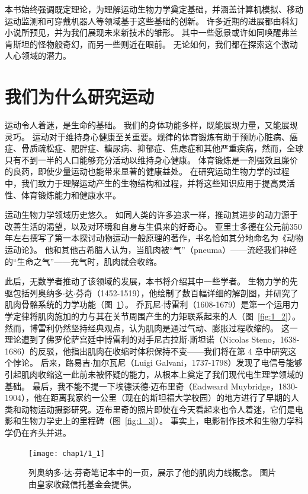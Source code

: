 本书始终强调既定理论，为理解运动生物力学奠定基础，并涵盖计算机模拟、移动运动监测和可穿戴机器人等领域基于这些基础的创新。
许多近期的进展都由科幻小说所预见，并为我们展现未来新技术的雏形。
其中一些愿景或许如同唤醒弗兰肯斯坦的怪物般奇幻，而另一些则近在眼前。
无论如何，我们都在探索这个激动人心领域的潜力。






\section{我们为什么研究运动}

运动令人着迷，是生命的基础。
我们的身体功能多样，既能展现力量，又能展现灵巧。
运动对于维持身心健康至关重要。规律的体育锻炼有助于预防心脏病、癌症、骨质疏松症、肥胖症、糖尿病、抑郁症、焦虑症和其他严重疾病，然而，全球只有不到一半的人口能够充分活动以维持身心健康。
体育锻炼是一剂强效且廉价的良药，即使少量运动也能带来显著的健康益处。
在研究运动生物力学的过程中，我们致力于理解运动产生的生物结构和过程，并将这些知识应用于提高灵活性、体育锻炼能力和健康水平。


运动生物力学领域历史悠久。
如同人类的许多追求一样，推动其进步的动力源于改善生活的渴望，以及对环境和自身与生俱来的好奇心。
亚里士多德在公元前350年左右撰写了第一本探讨动物运动一般原理的著作，书名恰如其分地命名为《动物运动论》。
他和其他古希腊人认为，当肌肉被“气”（pneuma）——流经我们神经的“生命之气”——充气时，肌肉就会收缩。


此后，无数学者推动了该领域的发展，本书将介绍其中一些学者。
生物力学的先驱包括列奥纳多$\cdot$达$\cdot$芬奇（1452-1519），他绘制了数百幅详细的解剖图，并研究了肌肉骨骼系统的力学功能（图~\ref{fig:1_1}）。
乔瓦尼$\cdot$博雷利（1608-1679）是第一个运用力学定律将肌肉施加的力与其在关节周围产生的力矩联系起来的人（图~\ref{fig:1_2}）。
然而，博雷利仍然坚持经典观点，认为肌肉是通过气动、膨胀过程收缩的。
这一理论遭到了佛罗伦萨宫廷中博雷利的对手尼古拉斯$\cdot$斯坦诺（Nicolas Steno，1638-1686）的反驳，他指出肌肉在收缩时体积保持不变——我们将在第 4 章中研究这个悖论。
后来，路易吉$\cdot$加尔瓦尼（Luigi Galvani，1737-1798）发现了电信号能够引起肌肉收缩这一此前未被怀疑的能力，从根本上奠定了我们现代电生理学领域的基础。
最后，我不能不提一下埃德沃德$\cdot$迈布里奇（Eadweard Muybridge，1830-1904），他在距离我家约一公里（现在的斯坦福大学校园）的地方进行了早期的人类和动物运动摄影研究。迈布里奇的照片即使在今天看起来也令人着迷，它们是电影和生物力学史上的里程碑（图~\ref{fig:1_3}）。
事实上，电影制作技术和生物力学科学仍在齐头并进。


\begin{figure}[!htb]
	\centering
	\texttt{[image: chap1/1\_1]}
	\caption{列奥纳多$\cdot$达$\cdot$芬奇笔记本中的一页，展示了他的肌肉力线概念。
		图片由皇家收藏信托基金会提供。 \label{fig:1_1}}
\end{figure}


